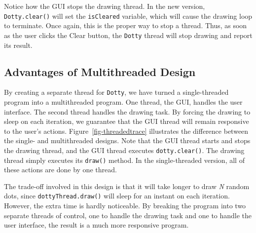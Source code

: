Notice how the GUI stops the drawing thread.  In the new version, {\tt
Dotty.clear()} will set the {\tt isCleared} variable, which will cause
the drawing loop to terminate.  Once again, this is the proper way to
stop a thread.  Thus, as soon as the user clicks the Clear button, the
{\tt Dotty} thread will stop drawing and report its result.


\subsection{Advantages of Multithreaded Design}
\noindent By creating a separate thread for {\tt Dotty}, we have turned
a single-threaded program into a multithreaded program.   One thread,
the GUI, handles the user interface.  The second thread handles the
drawing task.  By forcing the drawing to sleep on each iteration, we
guarantee that the GUI thread will remain responsive to the user's
actions.  Figure~\ref{fig-threadedtrace} illustrates the difference
between the single- and multithreaded designs.  Note that the GUI
thread starts and stops the drawing thread, and the GUI thread
executes {\tt dotty.clear()}.  The drawing thread simply executes its
{\tt draw()} method.  In the single-threaded version, all of these
actions are done by one thread.

\begin{figure}[h!]
\end{figure}

The trade-off involved in this design is that it will take
longer to draw {\it N} random dots, since {\tt dottyThread.draw()} will
sleep for an instant on each iteration.  However, the extra time is hardly
noticeable.  By breaking the program into two separate threads of
control, one to handle the drawing task and one to handle the user
interface, the result is a much more responsive program.


